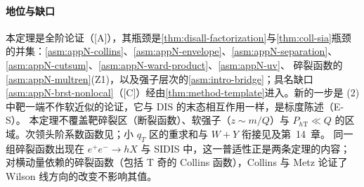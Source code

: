 \paragraph{地位与缺口}
本定理是全阶论证（[A]），其瓶颈是\cref{thm:disall-factorization}与\cref{thm:coll-sia}瓶颈的并集：\cref{asm:appN-collins}、\cref{asm:appN-envelope}、\cref{asm:appN-separation}、\cref{asm:appN-cutsum}、\cref{asm:appN-ward-product}、\cref{asm:appN-uv}、
碎裂函数的\cref{asm:appN-multren}(Z1)，以及强子层次的\cref{asm:intro-bridge}；具名缺口\cref{asm:appN-brst-nonlocal}（[C]）经由\cref{thm:method-template}进入。新的一步是 (2) 中靶一端不作软近似的论证，它与 DIS 的末态相互作用一样，是标度陈述（E-S）。
本定理不覆盖靶碎裂区（断裂函数）、软强子（$z\sim m/Q$）与 $P_{h\mathrm T}\ll Q$ 的区域。次领头阶系数函数见\cite{Graudenz1994}；小 $q_T$ 区的重求和与 $W+Y$ 衔接见\cite{Meng:1995yn,Nadolsky:1999kb}及第~14~章。
同一组碎裂函数出现在 $e^+e^-\to hX$ 与 SIDIS 中，这一普适性正是两条定理的内容；对横动量依赖的碎裂函数（包括 T 奇的 Collins 函数），Collins 与 Metz 论证了 Wilson 线方向的改变不影响其值\cite{CollinsMetz2004}。
